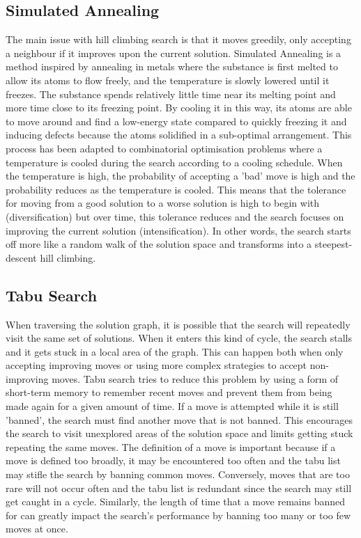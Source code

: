 \subsection{Simulated Annealing}

The main issue with hill climbing search is that it moves greedily, only accepting a neighbour if it improves upon the current solution. Simulated Annealing \citep{kirkpatrick1983optimization} is a method inspired by annealing in metals where the substance is first melted to allow its atoms to flow freely, and the temperature is slowly lowered until it freezes. The substance spends relatively little time near its melting point and more time close to its freezing point. By cooling it in this way, its atoms are able to move around and find a low-energy state compared to quickly freezing it and inducing defects because the atoms solidified in a sub-optimal arrangement. This process has been adapted to combinatorial optimisation problems where a temperature is cooled during the search according to a cooling schedule. When the temperature is high, the probability of accepting a 'bad' move is high and the probability reduces as the temperature is cooled. This means that the tolerance for moving from a good solution to a worse solution is high to begin with (diversification) but over time, this tolerance reduces and the search focuses on improving the current solution (intensification). In other words, the search starts off more like a random walk of the solution space and transforms into a steepest-descent hill climbing.

\subsection{Tabu Search}

When traversing the solution graph, it is possible that the search will repeatedly visit the same set of solutions. When it enters this kind of cycle, the search stalls and it gets stuck in a local area of the graph. This can happen both when only accepting improving moves or using more complex strategies to accept non-improving moves. Tabu search \citep{glover1989tabu} tries to reduce this problem by using a form of short-term memory to remember recent moves and prevent them from being made again for a given amount of time. If a move is attempted while it is still 'banned', the search must find another move that is not banned. This encourages the search to visit unexplored areas of the solution space and limits getting stuck repeating the same moves. The definition of a move is important because if a move is defined too broadly, it may be encountered too often and the tabu list may stifle the search by banning common moves. Conversely, moves that are too rare will not occur often and the tabu list is redundant since the search may still get caught in a cycle. Similarly, the length of time that a move remains banned for can greatly impact the search's performance by banning too many or too few moves at once.



